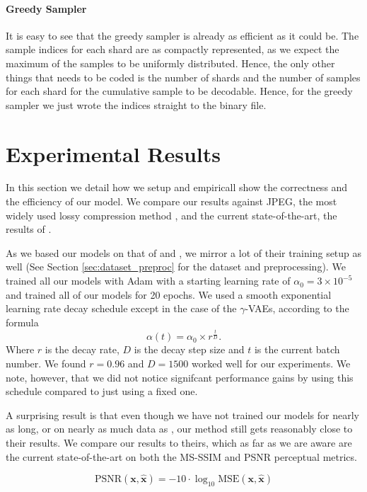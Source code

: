 \documentclass{article}
\renewcommand{\vec}[1]{\mathbf{#1}}
\begin{document}
\paragraph{Greedy Sampler} It is easy to see that the greedy sampler is already
as efficient as it could be. The sample indices for each shard are as compactly
represented, as we expect the maximum of the samples to be uniformly
distributed. Hence, the only other things that needs to be coded is the number
of shards and the number of samples for each shard for the cumulative sample to
be decodable. Hence, for the greedy sampler we just wrote the indices straight
to the binary file.

\section{Experimental Results}
\par
In this section we detail how we setup and empiricall show the correctness and
the efficiency of our model. We compare our results against JPEG, the most
widely used lossy compression method \cite{bull2014communicating}, and the
current state-of-the-art, the results of \cite{balle2018variational}\footnotemark.
\cite{zhao2015loss}


\par
As we based our models on that of \cite{balle2016end} and
\cite{balle2018variational}, we mirror a lot of their training setup as well
(See Section \ref{sec:dataset_preproc} for the dataset and preprocessing). We
trained all our models with Adam with a starting learning rate of $\alpha_0 =
3 \times 10^{-5}$ and trained all of our models for 20 epochs. We used a smooth
exponential learning rate decay schedule except in the case of the
$\gamma$-VAEs, according to the formula
\[
  \alpha(t) = \alpha_0 \times r^{\frac{t}{D}}.
\]
Where $r$ is the decay rate, $D$ is the decay step size and $t$ is the current
batch number. We found $r = 0.96$ and $D = 1500$ worked well for our
experiments. We note, however, that we did not notice signifcant performance
gains by using this schedule compared to just using a fixed one.
\par
A surprising result is that even though we have not trained our models for
nearly as long, or on nearly as much data as \cite{balle2018variational}, our
method still gets reasonably close to their results. We compare our results to
theirs, which as far as we are aware are the current state-of-the-art on both
the MS-SSIM and PSNR perceptual metrics.
\par
\begin{equation}
\label{eq:metric_psnr}
\text{PSNR}(\vec{x}, \vec{\hat{x}}) =
-10 \cdot \log_{10}\text{MSE}(\vec{x}, \vec{\hat{x}})
\end{equation}
\end{document}
